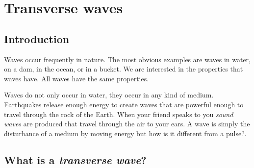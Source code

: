 \chapter{Transverse waves}
    \setcounter{figure}{1}
    \setcounter{subfigure}{1}
    \label{m38806}
    \section{Introduction}
            \nopagebreak
      \label{m38806*id317331}Waves occur frequently in nature. The most obvious examples are
waves in water, on a dam, in the ocean, or in a bucket. We are
interested in the properties that waves have. All waves have
the same properties.

Waves do not only occur in water, they occur in any kind of medium. Earthquakes release enough energy to create waves that are powerful enough to travel through the rock of the Earth. When your friend speaks to you \textsl{sound waves} are produced that travel through the air to your ears. A wave is simply the disturbance of a medium by moving energy but how is it different from a pulse?.
    \section{What is a \textsl{transverse wave}?}

